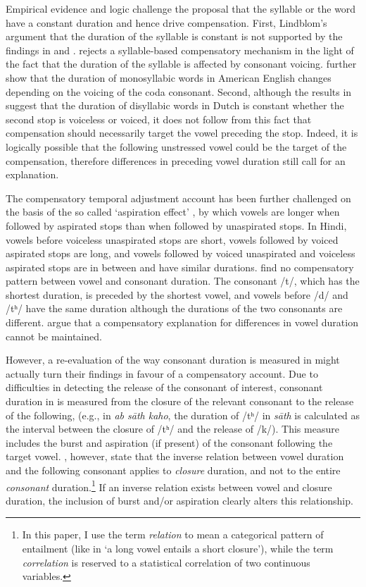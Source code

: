 \documentclass[charis]{glossa}
\begin{document}
Empirical evidence and logic challenge the proposal that the syllable or
the word have a constant duration and hence drive compensation. First,
Lindblom's \citeyear{lindblom1967} argument that the duration of the
syllable is constant is not supported by the findings in
\citet{chen1970} and \citet{jacewicz2009}. \citet{chen1970} rejects a
syllable-based compensatory mechanism in the light of the fact that the
duration of the syllable is affected by consonant voicing.
\citet{jacewicz2009} further show that the duration of monosyllabic
words in American English changes depending on the voicing of the coda
consonant. Second, although the results in \citet{slis1969} suggest that
the duration of disyllabic words in Dutch is constant whether the second
stop is voiceless or voiced, it does not follow from this fact that
compensation should necessarily target the vowel preceding the stop.
Indeed, it is logically possible that the following unstressed vowel
could be the target of the compensation, therefore differences in
preceding vowel duration still call for an explanation.

The compensatory temporal adjustment account has been further challenged
on the basis of the so called `aspiration effect' \citep{maddieson1976},
by which vowels are longer when followed by aspirated stops than when
followed by unaspirated stops. In Hindi, vowels before voiceless
unaspirated stops are short, vowels followed by voiced aspirated stops
are long, and vowels followed by voiced unaspirated and voiceless
aspirated stops are in between and have similar durations.
\citet{maddieson1976} find no compensatory pattern between vowel and
consonant duration. The consonant /t/, which has the shortest duration,
is preceded by the shortest vowel, and vowels before /d/ and /tʰ/ have
the same duration although the durations of the two consonants are
different. \citet{maddieson1976} argue that a compensatory explanation
for differences in vowel duration cannot be maintained.

However, a re-evaluation of the way consonant duration is measured in
\citet{maddieson1976} might actually turn their findings in favour of a
compensatory account. Due to difficulties in detecting the release of
the consonant of interest, consonant duration in \citet{maddieson1976}
is measured from the closure of the relevant consonant to the release of
the following, (e.g., in \emph{ab sāth kaho}, the duration of /tʰ/ in
\emph{sāth} is calculated as the interval between the closure of /tʰ/
and the release of /k/). This measure includes the burst and aspiration
(if present) of the consonant following the target vowel.
\citet{slis1969a}, however, state that the inverse relation between
vowel duration and the following consonant applies to \textit{closure}
duration, and not to the entire \textit{consonant}
duration.\footnote{In this paper, I use the term \textit{relation} to mean a categorical pattern of entailment (like in `a long vowel entails a short closure'), while the term \textit{correlation} is reserved to a statistical correlation of two continuous variables.}
If an inverse relation exists between vowel and closure duration, the
inclusion of burst and/or aspiration clearly alters this relationship.
\end{document}
